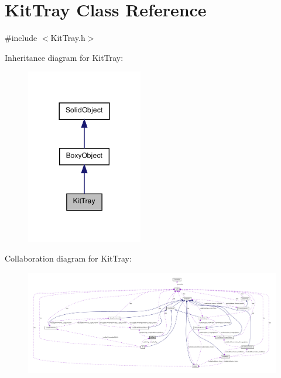 \hypertarget{class_kit_tray}{
\section{KitTray Class Reference}
\label{class_kit_tray}
}


{\ttfamily \#include $<$KitTray.h$>$}



Inheritance diagram for KitTray:\nopagebreak
\begin{figure}[H]
\begin{center}
\leavevmode
\includegraphics[width=144pt]{class_kit_tray__inherit__graph}
\end{center}
\end{figure}


Collaboration diagram for KitTray:\nopagebreak
\begin{figure}[H]
\begin{center}
\leavevmode
\includegraphics[width=400pt]{class_kit_tray__coll__graph}
\end{center}
\end{figure}
